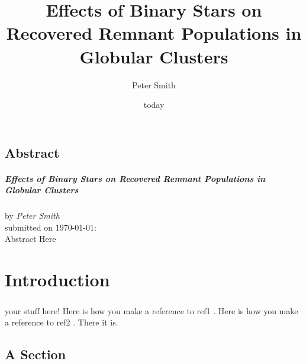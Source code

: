 \documentclass[12pt, oneside]{smuthesis}
\begin{document}
\frontmatter
\title{\sc Effects of Binary Stars on Recovered Remnant Populations in Globular Clusters}
\author{Peter Smith}
\date{today}
\medskip

\maketitle
\pagestyle{headings}

\begin{center}
\section*{\center \sc Abstract}
\paragraph*{\center \sc Effects of Binary Stars on Recovered Remnant Populations in Globular Clusters\\}
by {\em Peter Smith}\\
submitted on \today:\\

Abstract Here


\end{center}
\newpage

\tableofcontents
\listoffigures
\listoftables
\newpage
%
\mainmatter
\chapter{\sc Introduction}
\paragraph*{}

your stuff here! Here is how you make a reference to ref1 \citep{test1}. Here is how you make a reference to ref2 \citep{test2}. There it is.

\citet{Abbate2018}

\section{\sc A Section}
\end{document}
